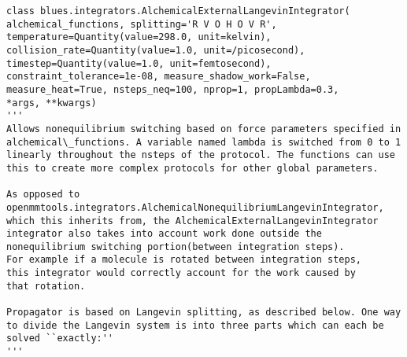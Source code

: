 \begin{description}
\begin{verbatim}
class blues.integrators.AlchemicalExternalLangevinIntegrator(
alchemical_functions, splitting='R V O H O V R',
temperature=Quantity(value=298.0, unit=kelvin),
collision_rate=Quantity(value=1.0, unit=/picosecond), 
timestep=Quantity(value=1.0, unit=femtosecond), 
constraint_tolerance=1e-08, measure_shadow_work=False, 
measure_heat=True, nsteps_neq=100, nprop=1, propLambda=0.3,
*args, **kwargs)
'''
Allows nonequilibrium switching based on force parameters specified in
alchemical\_functions. A variable named lambda is switched from 0 to 1
linearly throughout the nsteps of the protocol. The functions can use
this to create more complex protocols for other global parameters.

As opposed to
openmmtools.integrators.AlchemicalNonequilibriumLangevinIntegrator,
which this inherits from, the AlchemicalExternalLangevinIntegrator
integrator also takes into account work done outside the
nonequilibrium switching portion(between integration steps). 
For example if a molecule is rotated between integration steps, 
this integrator would correctly account for the work caused by 
that rotation.

Propagator is based on Langevin splitting, as described below. One way
to divide the Langevin system is into three parts which can each be
solved ``exactly:''
'''
\end{verbatim}


\end{description}

